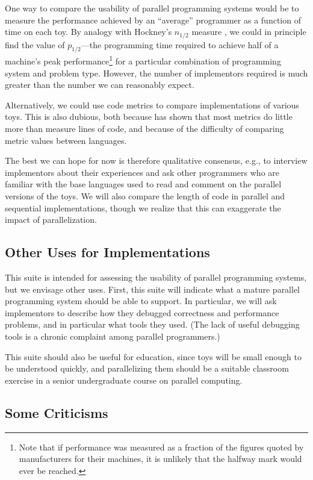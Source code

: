 One way to compare the usability of parallel programming systems would be
to measure the performance achieved by an ``average'' programmer
as a function of time on each toy.
By analogy with Hockney's $n_{1/2}$ measure \cite{b:hockney-perfparam},
we could in principle find the value of $p_{1/2}$---the programming time required to achieve
half of a machine's peak performance\footnote{Note that
	if performance was measured as a fraction of the figures quoted by manufacturers for their machines,
	it is unlikely that the halfway mark would ever be reached.}
for a particular combination of programming system and problem type.
However,
the number of implementors required is much greater than the number we can reasonably expect.

Alternatively,
we could use code metrics
to compare implementations of various toys.
This is also dubious,
both because \cite{b:el-emam-metrics} has shown that most metrics do little more than measure lines of code,
and because of the difficulty of comparing metric values between languages.

The best we can hope for now is therefore qualitative consensus,
e.g.,
to interview implementors about their experiences
and ask other programmers who are familiar with the base languages used
to read and comment on the parallel versions of the toys.
We will also compare the length of code in parallel and sequential implementations,
though we realize that this can exaggerate the impact of parallelization.

\subsection{Other Uses for Implementations\label{s:method-uses}}

This suite is intended for assessing the usability of parallel programming systems,
but we envisage other uses.
First, this suite will indicate
what a mature parallel programming system should be able to support.
In particular,
we will ask implementors to describe how they debugged correctness and performance problems,
and in particular what tools they used.
(The lack of useful debugging tools is a chronic complaint among parallel programmers.)

This suite should also be useful for education,
since toys will be small enough to be understood quickly,
and parallelizing them should be a suitable classroom exercise
in a senior undergraduate course on parallel computing.

\subsection{Some Criticisms\label{s:method-criticism}}

